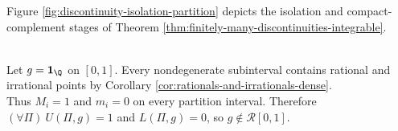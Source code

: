 \noindent Figure \ref{fig:discontinuity-isolation-partition} depicts the isolation and compact-complement stages of Theorem \ref{thm:finitely-many-discontinuities-integrable}.

\begin{illustrationfigure}[H]
  \centering
  
  \caption{A short interval $I=[u,v]$ isolates a discontinuity $c$, while the compact complement $K$ supports uniform control.}
  \label{fig:discontinuity-isolation-partition}
\end{illustrationfigure}

\begin{example} \label{ex:dirichlet-function-not-riemann-integrable} \\
Let $g=\mathbf{1}_{\Q}$ on $[0,1]$. Every nondegenerate subinterval contains rational and irrational points by Corollary \ref{cor:rationals-and-irrationals-dense}.\\
Thus $M_i=1$ and $m_i=0$ on every partition interval. Therefore $(\forall\Pi)\ U(\Pi,g)=1$ and $L(\Pi,g)=0$, so $g\notin\mathcal{R}[0,1]$.
\end{example}

